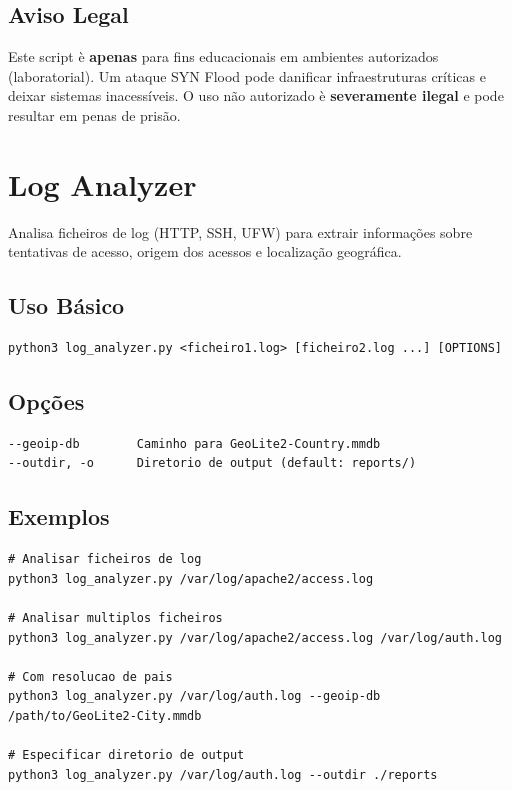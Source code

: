 \documentclass[11pt,a4paper]{article}
\begin{document}
\subsection{Aviso Legal}
Este script \`e \textbf{apenas} para fins educacionais em ambientes autorizados (laboratorial). Um ataque SYN Flood pode danificar infraestruturas cr\'iticas e deixar sistemas inacess\'iveis. O uso n\~ao autorizado \`e \textbf{severamente ilegal} e pode resultar em penas de pris\~ao.

\section{Log Analyzer}
Analisa ficheiros de log (HTTP, SSH, UFW) para extrair informa\c{c}\~oes sobre tentativas de acesso, origem dos acessos e localiza\c{c}\~ao geogr\'afica.

\subsection{Uso B\'asico}
\begin{lstlisting}[style=bash]
python3 log_analyzer.py <ficheiro1.log> [ficheiro2.log ...] [OPTIONS]
\end{lstlisting}

\subsection{Op\c{c}\~oes}
\begin{lstlisting}[style=bash]
--geoip-db        Caminho para GeoLite2-Country.mmdb
--outdir, -o      Diretorio de output (default: reports/)
\end{lstlisting}

\subsection{Exemplos}
\begin{lstlisting}[style=bash]
# Analisar ficheiros de log
python3 log_analyzer.py /var/log/apache2/access.log

# Analisar multiplos ficheiros
python3 log_analyzer.py /var/log/apache2/access.log /var/log/auth.log

# Com resolucao de pais
python3 log_analyzer.py /var/log/auth.log --geoip-db /path/to/GeoLite2-City.mmdb

# Especificar diretorio de output
python3 log_analyzer.py /var/log/auth.log --outdir ./reports
\end{lstlisting}
\end{document}
